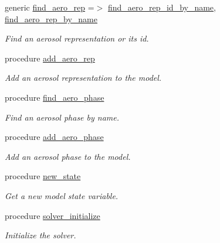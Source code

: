 \begin{DoxyCompactItemize}
generic \mbox{\hyperlink{structpmc__phlex__core_1_1phlex__core__t_ab9d1d21fd1188091072f6440628ed826}{find\+\_\+aero\+\_\+rep}} =$>$ \mbox{\hyperlink{structpmc__phlex__core_1_1phlex__core__t_ab83bfd3d2af2f76074a52bb002080dd9}{find\+\_\+aero\+\_\+rep\+\_\+id\+\_\+by\+\_\+name}}, \mbox{\hyperlink{structpmc__phlex__core_1_1phlex__core__t_a96eca5daa38236792c662465d0cdac99}{find\+\_\+aero\+\_\+rep\+\_\+by\+\_\+name}}
\begin{DoxyCompactList}\small\item\em Find an aerosol representation or it\textquotesingle{}s id. \end{DoxyCompactList}\item 
procedure \mbox{\hyperlink{structpmc__phlex__core_1_1phlex__core__t_af9ceb8ffe7584d7871afb3511ad60b69}{add\+\_\+aero\+\_\+rep}}
\begin{DoxyCompactList}\small\item\em Add an aerosol representation to the model. \end{DoxyCompactList}\item 
procedure \mbox{\hyperlink{structpmc__phlex__core_1_1phlex__core__t_aa0234967af4fcc7ae0477c45be949f09}{find\+\_\+aero\+\_\+phase}}
\begin{DoxyCompactList}\small\item\em Find an aerosol phase by name. \end{DoxyCompactList}\item 
procedure \mbox{\hyperlink{structpmc__phlex__core_1_1phlex__core__t_a374eb0fbb2bbb91e52deab0130873876}{add\+\_\+aero\+\_\+phase}}
\begin{DoxyCompactList}\small\item\em Add an aerosol phase to the model. \end{DoxyCompactList}\item 
procedure \mbox{\hyperlink{structpmc__phlex__core_1_1phlex__core__t_aad616d6150b13d08a9fc418e274d536e}{new\+\_\+state}}
\begin{DoxyCompactList}\small\item\em Get a new model state variable. \end{DoxyCompactList}\item 
procedure \mbox{\hyperlink{structpmc__phlex__core_1_1phlex__core__t_a76c1ae885035c0cc6a61ca6d5dc23a84}{solver\+\_\+initialize}}
\begin{DoxyCompactList}\small\item\em Initialize the solver. \end{DoxyCompactList}\item 

\end{DoxyCompactItemize}
